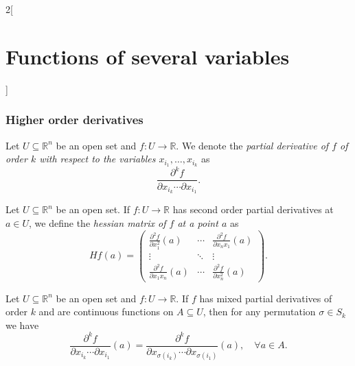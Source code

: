 \documentclass[class=article,10pt,crop=false]{standalone}
\begin{document}
\begin{multicols}{2}[\section{Functions of several variables}]
\subsubsection*{Higher order derivatives}
\begin{definition}
Let $U\subseteq\mathbb{R}^n$ be an open set and $f:U\rightarrow\mathbb{R}$. We denote the \textit{partial derivative of $f$ of order $k$ with respect to the variables $x_{i_1},\ldots,x_{i_k}$} as $$\frac{\partial^kf}{\partial x_{i_k}\cdots\partial x_{i_1}}.$$
\end{definition}
\begin{definition}
Let $U\subseteq\mathbb{R}^n$ be an open set. If $f:U\rightarrow\mathbb{R}$ has second order partial derivatives at $a\in U$, we define the \textit{hessian matrix of $f$ at a point $a$} as $$Hf(a)=\begin{pmatrix}
\displaystyle \frac{\partial^2 f}{\partial x_1^2}(a) &\cdots & \displaystyle \frac{\partial^2 f}{\partial x_nx_1}(a)\\
\vdots & \ddots & \vdots \\
\displaystyle \frac{\partial^2 f}{\partial x_1x_n}(a) & \cdots & \displaystyle \frac{\partial^2 f}{\partial x_n^2}(a)
\end{pmatrix}.$$
\end{definition}
\begin{theorem}
Let $U\subseteq\mathbb{R}^n$ be an open set and $f:U\rightarrow\mathbb{R}$. If $f$ has mixed partial derivatives of order $k$ and are continuous functions on $A\subseteq U$, then for any permutation $\sigma\in S_k$ we have $$\frac{\partial^kf}{\partial x_{i_k}\cdots\partial x_{i_1}}(a)=\frac{\partial^kf}{\partial x_{\sigma(i_k)}\cdots\partial x_{\sigma(i_1)}}(a),\quad\forall a\in A.$$
\end{theorem}

\end{multicols}
\end{document}
